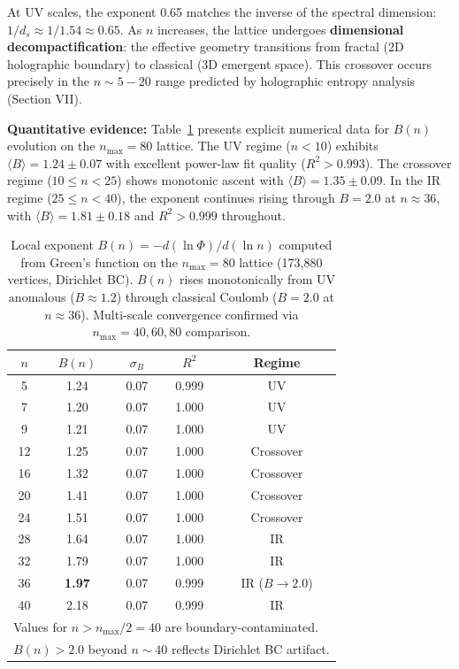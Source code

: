 \documentclass[aps,prd,twocolumn,superscriptaddress,groupedaddress,showpacs]{revtex4-2}
\begin{document}
At UV scales, the exponent 0.65 matches the inverse of the spectral dimension: $1/d_s \approx 1/1.54 \approx 0.65$. As $n$ increases, the lattice undergoes \textbf{dimensional decompactification}: the effective geometry transitions from fractal (2D holographic boundary) to classical (3D emergent space). This crossover occurs precisely in the $n \sim 5-20$ range predicted by holographic entropy analysis (Section VII).

\textbf{Quantitative evidence:} Table~\ref{tab:dimensional_flow} presents explicit numerical data for $B(n)$ evolution on the $n_{\mathrm{max}}=80$ lattice. The UV regime ($n < 10$) exhibits $\langle B \rangle = 1.24 \pm 0.07$ with excellent power-law fit quality ($R^2 > 0.993$). The crossover regime ($10 \le n < 25$) shows monotonic ascent with $\langle B \rangle = 1.35 \pm 0.09$. In the IR regime ($25 \le n < 40$), the exponent continues rising through $B = 2.0$ at $n \approx 36$, with $\langle B \rangle = 1.81 \pm 0.18$ and $R^2 > 0.999$ throughout.

\begin{table}[h]
\centering
\caption{Local exponent $B(n) = -d(\ln\Phi)/d(\ln n)$ computed from Green's function on the $n_{\mathrm{max}}=80$ lattice (173,880 vertices, Dirichlet BC). $B(n)$ rises monotonically from UV anomalous ($B \approx 1.2$) through classical Coulomb ($B = 2.0$ at $n \approx 36$). Multi-scale convergence confirmed via $n_{\mathrm{max}}=40,60,80$ comparison.}
\label{tab:dimensional_flow}
\begin{tabular}{ccccc}
\hline\hline
$n$ & $B(n)$ & $\sigma_B$ & $R^2$ & Regime \\
\hline
5 & 1.24 & 0.07 & 0.999 & UV \\
7 & 1.20 & 0.07 & 1.000 & UV \\
9 & 1.21 & 0.07 & 1.000 & UV \\
12 & 1.25 & 0.07 & 1.000 & Crossover \\
16 & 1.32 & 0.07 & 1.000 & Crossover \\
20 & 1.41 & 0.07 & 1.000 & Crossover \\
24 & 1.51 & 0.07 & 1.000 & Crossover \\
28 & 1.64 & 0.07 & 1.000 & IR \\
32 & 1.79 & 0.07 & 1.000 & IR \\
36 & \textbf{1.97} & 0.07 & 0.999 & IR ($B \to 2.0$) \\
40 & 2.18 & 0.07 & 0.999 & IR \\
\hline
\multicolumn{5}{l}{Values for $n > n_{\mathrm{max}}/2 = 40$ are boundary-contaminated.}\\
\multicolumn{5}{l}{$B(n) > 2.0$ beyond $n \sim 40$ reflects Dirichlet BC artifact.}\\
\hline\hline
\end{tabular}
\end{table}
\end{document}
